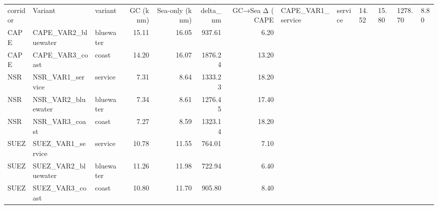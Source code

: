\begin{tabular}{lllrrrr}
\toprule
corridor &             Variant &   variant &  GC (k nm) &  Sea-only (k nm) &  delta_nm &  GC→Sea Δ (%
\midrule
    CAPE &   CAPE_VAR1_service &   service &      14.52 &            15.80 &   1278.70 &          8.80 \\
    CAPE & CAPE_VAR2_bluewater & bluewater &      15.11 &            16.05 &    937.61 &          6.20 \\
    CAPE &     CAPE_VAR3_coast &     coast &      14.20 &            16.07 &   1876.24 &         13.20 \\
     NSR &    NSR_VAR1_service &   service &       7.31 &             8.64 &   1333.23 &         18.20 \\
     NSR &  NSR_VAR2_bluewater & bluewater &       7.34 &             8.61 &   1276.45 &         17.40 \\
     NSR &      NSR_VAR3_coast &     coast &       7.27 &             8.59 &   1323.14 &         18.20 \\
    SUEZ &   SUEZ_VAR1_service &   service &      10.78 &            11.55 &    764.01 &          7.10 \\
    SUEZ & SUEZ_VAR2_bluewater & bluewater &      11.26 &            11.98 &    722.94 &          6.40 \\
    SUEZ &     SUEZ_VAR3_coast &     coast &      10.80 &            11.70 &    905.80 &          8.40 \\
\bottomrule
\end{tabular}
